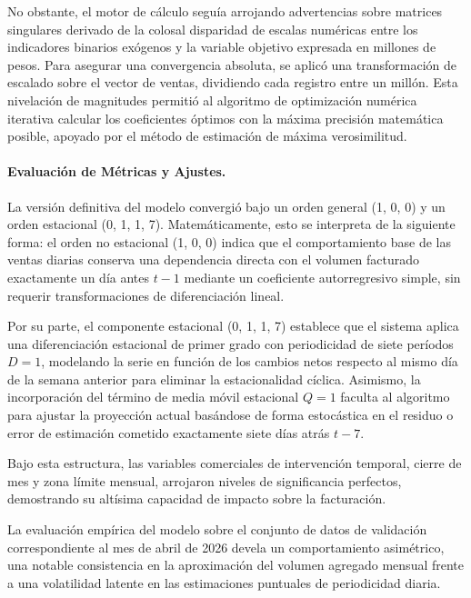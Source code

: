 \documentclass[11pt,a4paper]{report}
\begin{document}
        No obstante, el motor de cálculo seguía arrojando advertencias sobre matrices singulares derivado de la colosal disparidad de
        escalas numéricas entre los indicadores binarios exógenos y la variable objetivo expresada en millones de pesos.
        Para asegurar una convergencia absoluta, se aplicó una transformación de escalado sobre el vector de ventas, dividiendo
        cada registro entre un millón. Esta nivelación de magnitudes permitió al algoritmo de optimización numérica iterativa calcular
        los coeficientes óptimos con la máxima precisión matemática posible, apoyado por el método de estimación de máxima verosimilitud.

        \paragraph{Evaluación de Métricas y Ajustes.}
        La versión definitiva del modelo convergió bajo un orden general (1, 0, 0) y un orden estacional (0, 1, 1, 7). 
        Matemáticamente, esto se interpreta de la siguiente forma: el orden no estacional (1, 0, 0) indica que el comportamiento 
        base de las ventas diarias conserva una dependencia directa con el volumen facturado exactamente un día antes $t-1$ 
        mediante un coeficiente autorregresivo simple, sin requerir transformaciones de diferenciación lineal.
        
        Por su parte, el componente estacional (0, 1, 1, 7) establece que el sistema aplica una diferenciación estacional de primer grado con 
        periodicidad de siete períodos $D=1$, modelando la serie en función de los cambios netos respecto al mismo día de la 
        semana anterior para eliminar la estacionalidad cíclica. Asimismo, la incorporación del término de media móvil estacional 
        $Q=1$ faculta al algoritmo para ajustar la proyección actual basándose de forma estocástica en el residuo o error de 
        estimación cometido exactamente siete días atrás $t-7$.

        Bajo esta estructura, las variables comerciales de intervención temporal, cierre de mes y zona límite mensual, arrojaron niveles
        de significancia perfectos, demostrando su altísima capacidad de impacto sobre la facturación.

        La evaluación empírica del modelo sobre el conjunto de datos de validación correspondiente al mes de abril de 2026 devela un comportamiento
        asimétrico, una notable consistencia en la aproximación del volumen agregado mensual frente a una volatilidad latente en las estimaciones
        puntuales de periodicidad diaria.
\end{document}
